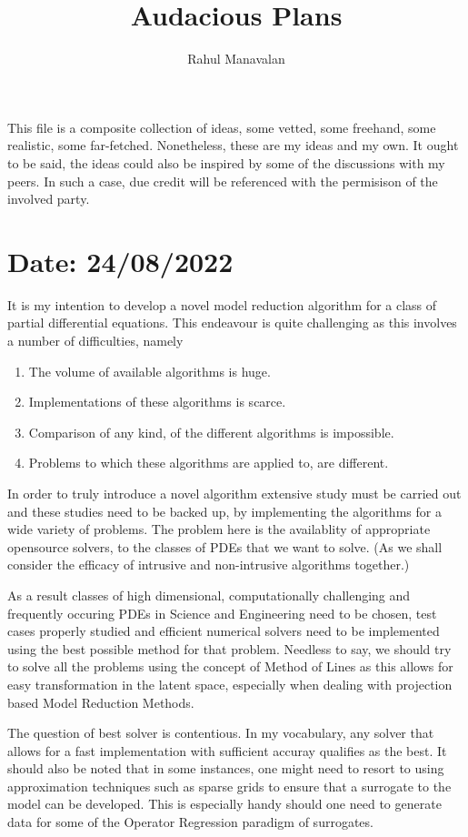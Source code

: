 \documentclass{article}
\title{Audacious Plans}
\author{Rahul Manavalan}
\date{}
\begin{document}
\maketitle

This file is a composite collection of ideas, some vetted, some freehand, some realistic, some far-fetched. 
Nonetheless, these are my ideas and my own.
It ought to be said, the ideas could also be inspired by some of the discussions with my peers.
In such a case, due credit will be referenced with the permisison of the involved party.


\section{Date: 24/08/2022}
It is my intention to develop a novel model reduction algorithm for a class of partial differential equations.
This endeavour is quite challenging as this involves a number of difficulties, namely
\begin{enumerate}
    \item The volume of available algorithms is huge.
    \item Implementations of these algorithms is scarce.
    \item Comparison of any kind, of the different algorithms is impossible.
    \item Problems to which these algorithms are applied to, are different.
\end{enumerate}

In order to truly introduce a novel algorithm extensive study must be carried out and these studies need to be backed up,
by implementing the algorithms for a wide variety of problems. The problem here is the availablity of appropriate opensource solvers,
to the classes of PDEs that we want to solve. (As we shall consider the efficacy of intrusive and non-intrusive algorithms together.)

As a result classes of high dimensional, computationally challenging and frequently occuring PDEs in Science and Engineering need to be chosen,
test cases properly studied and efficient numerical solvers need to be implemented using the best possible method for that problem. Needless to say,
we should try to solve all the problems using the concept of Method of Lines as this allows for easy transformation in the latent space, especially when dealing with
projection based Model Reduction Methods. 

The question of best solver is contentious. In my vocabulary, any solver that allows for a fast implementation with sufficient accuray qualifies as the best.
It should also be noted that in some instances, one might need to resort to using approximation techniques such as sparse grids to ensure that a surrogate to the model can be developed.
This is especially handy should one need to generate data for some of the Operator Regression paradigm of surrogates.
\end{document}
